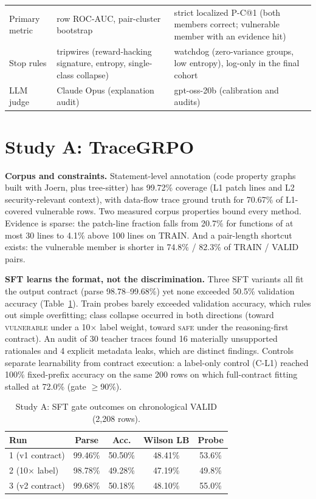 \documentclass[journal]{IEEEtran}
\makeatletter
\newcommand{\vuln}{\textsc{vulnerable}}
\newcommand{\safe}{\textsc{safe}}
\newcommand{\pc}{P-C@1}
\makeatother
\begin{document}
\begin{table}[t]
\begin{tabular}{p{2.4cm}p{7.3cm}p{7.3cm}}
Primary metric & row ROC-AUC, pair-cluster bootstrap & strict localized \pc{} (both members correct; vulnerable member with an evidence hit)\\
Stop rules & tripwires (reward-hacking signature, entropy, single-class collapse) & watchdog (zero-variance groups, low entropy), log-only in the final cohort\\
LLM judge & Claude Opus (explanation audit) & gpt-oss-20b (calibration and audits)\\
\bottomrule
\end{tabular}
\end{table}

\section{Study A: TraceGRPO}
\label{sec:programA}
\textbf{Corpus and constraints.} Statement-level annotation (code property graphs~\cite{yamaguchi} built with Joern, plus tree-sitter) has 99.72\% coverage (L1 patch lines and L2 security-relevant context), with data-flow trace ground truth for 70.67\% of L1-covered vulnerable rows. Two measured corpus properties bound every method. Evidence is sparse: the patch-line fraction falls from 20.7\% for functions of at most 30 lines to 4.1\% above 100 lines on TRAIN. And a pair-length shortcut exists: the vulnerable member is shorter in 74.8\% / 82.3\% of TRAIN / VALID pairs.

\textbf{SFT learns the format, not the discrimination.} Three SFT variants all fit the output contract (parse 98.78--99.68\%) yet none exceeded 50.5\% validation accuracy (Table~\ref{tab:sft}). Train probes barely exceeded validation accuracy, which rules out simple overfitting; class collapse occurred in both directions (toward \vuln{} under a 10$\times$ label weight, toward \safe{} under the reasoning-first contract). An audit of 30 teacher traces found 16 materially unsupported rationales and 4 explicit metadata leaks, which are distinct findings. Controls separate learnability from contract execution: a label-only control (C-L1) reached 100\% fixed-prefix accuracy on the same 200 rows on which full-contract fitting stalled at 72.0\% (gate $\ge$90\%).

\begin{table}[t]
\centering\footnotesize\setlength{\tabcolsep}{3.5pt}
\caption{Study A: SFT gate outcomes on chronological VALID (2,208 rows).}
\label{tab:sft}
\begin{tabular}{lcccc}
\toprule
Run & Parse & Acc. & Wilson LB & Probe\\
\midrule
1 (v1 contract) & 99.46\% & 50.50\% & 48.41\% & 53.6\%\\
2 (10$\times$ label) & 98.78\% & 49.28\% & 47.19\% & 49.8\%\\
3 (v2 contract) & 99.68\% & 50.18\% & 48.10\% & 55.0\%\\
\bottomrule
\end{tabular}
\end{table}
\end{document}
